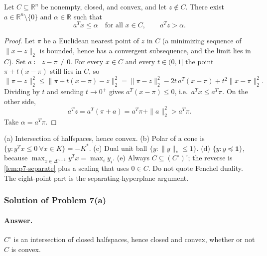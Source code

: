 \documentclass[11pt,a4paper]{article}
\begin{document}
\begin{lemma}
\label{lem:p7-separate}
Let \(C\subseteq\mathbb{R}^{n}\) be nonempty, closed, and convex, and let \(z\notin C\). There exist \(a\in\mathbb{R}^{n}\setminus\{0\}\) and \(\alpha\in\mathbb{R}\) such that
\[
a^{T}x\le\alpha
\quad\text{for all }x\in C,
\qquad
a^{T}z>\alpha.
\]
\end{lemma}

\begin{proof}
Let \(\pi\) be a Euclidean nearest point of \(z\) in \(C\) (a minimizing sequence of \(\|x-z\|_{2}\) is bounded, hence has a convergent subsequence, and the limit lies in \(C\)). Set \(a\coloneqq z-\pi\neq 0\). For every \(x\in C\) and every \(t\in(0,1]\) the point \(\pi+t(x-\pi)\) still lies in \(C\), so
\[
\|\pi-z\|_{2}^{2}
\le
\bigl\|\pi+t(x-\pi)-z\bigr\|_{2}^{2}
=
\|\pi-z\|_{2}^{2}
-2t\,a^{T}(x-\pi)
+t^{2}\|x-\pi\|_{2}^{2}.
\]
Dividing by \(t\) and sending \(t\to 0^{+}\) gives \(a^{T}(x-\pi)\le 0\), i.e.\ \(a^{T}x\le a^{T}\pi\). On the other side,
\[
a^{T}z
=
a^{T}(\pi+a)
=
a^{T}\pi+\|a\|_{2}^{2}
>
a^{T}\pi.
\]
Take \(\alpha=a^{T}\pi\).
\end{proof}

\begin{examnote}
\label{exnote:p7}
(a) Intersection of halfspaces, hence convex. (b) Polar of a cone is \(\{y:y^{T}x\le 0\ \forall x\in K\}=-K^{*}\). (c) Dual unit ball \(\{y:\|y\|_{*}\le 1\}\). (d) \(\{y:y\preceq\mathbf{1}\}\), because \(\max_{x\in\Delta^{n-1}}y^{T}x=\max_{i}y_{i}\). (e) Always \(C\subseteq(C^{\circ})^{\circ}\); the reverse is \cref{lem:p7-separate} plus a scaling that uses \(0\in C\). Do not quote Fenchel duality. The eight-point part is the separating-hyperplane argument.
\end{examnote}

\subsubsection{Solution of Problem 7(a)}

\paragraph{Answer.}
\(C^{\circ}\) is an intersection of closed halfspaces, hence closed and convex, whether or not \(C\) is convex.
\end{document}
